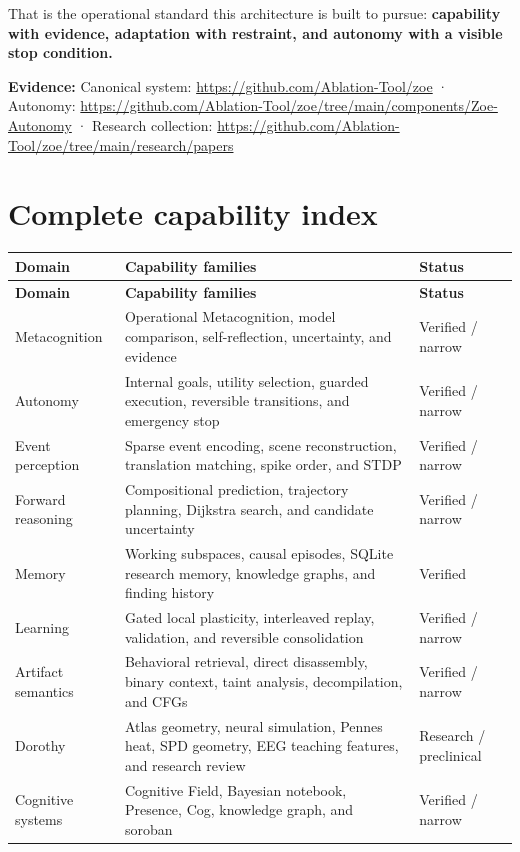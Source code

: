 \documentclass[11pt]{article}
\newcommand{\evidence}[1]{\par\smallskip\small\color{ZoeGray}\textbf{Evidence:} #1\normalsize\par\smallskip}
\begin{document}
That is the operational standard this architecture is built to pursue: \textbf{capability with evidence, adaptation with restraint, and autonomy with a visible stop condition.}

\evidence{Canonical system: \url{https://github.com/Ablation-Tool/zoe} · Autonomy: \url{https://github.com/Ablation-Tool/zoe/tree/main/components/Zoe-Autonomy} · Research collection: \url{https://github.com/Ablation-Tool/zoe/tree/main/research/papers}}

\clearpage
\appendix
\section{Complete capability index}

\begin{longtable}{p{}p{}p{}}
\toprule
\textbf{Domain} & \textbf{Capability families} & \textbf{Status}\\
\midrule
\endfirsthead
\toprule
\textbf{Domain} & \textbf{Capability families} & \textbf{Status}\\
\midrule
\endhead
Metacognition & Operational Metacognition, model comparison, self-reflection, uncertainty, and evidence & Verified / narrow\\
Autonomy & Internal goals, utility selection, guarded execution, reversible transitions, and emergency stop & Verified / narrow\\
Event perception & Sparse event encoding, scene reconstruction, translation matching, spike order, and STDP & Verified / narrow\\
Forward reasoning & Compositional prediction, trajectory planning, Dijkstra search, and candidate uncertainty & Verified / narrow\\
Memory & Working subspaces, causal episodes, SQLite research memory, knowledge graphs, and finding history & Verified\\
Learning & Gated local plasticity, interleaved replay, validation, and reversible consolidation & Verified / narrow\\
Artifact semantics & Behavioral retrieval, direct disassembly, binary context, taint analysis, decompilation, and CFGs & Verified / narrow\\
Dorothy & Atlas geometry, neural simulation, Pennes heat, SPD geometry, EEG teaching features, and research review & Research / preclinical\\
Cognitive systems & Cognitive Field, Bayesian notebook, Presence, Cog, knowledge graph, and soroban & Verified / narrow\\

\end{longtable}
\end{document}
